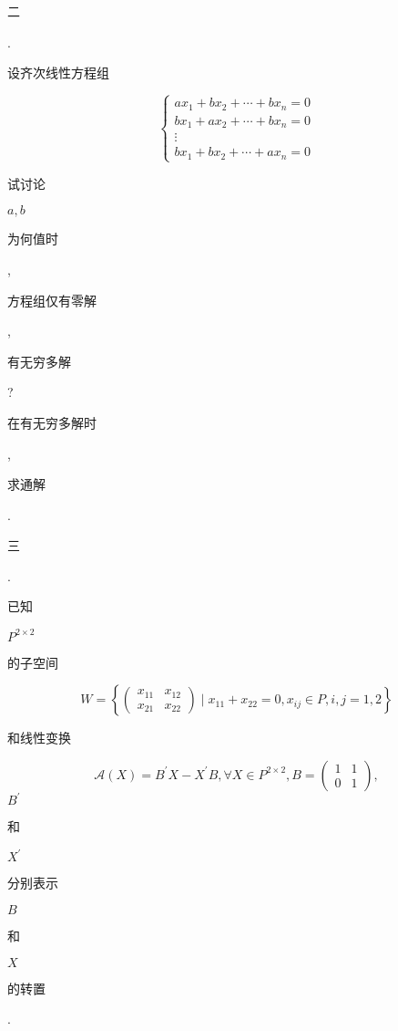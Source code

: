 \documentclass[10pt]{article}
\begin{document}
\begin{CJK}{UTF8}{mj}二\end{CJK}. \begin{CJK}{UTF8}{mj}设齐次线性方程组\end{CJK}
$$
\left\{\begin{array}{c}
a x_{1}+b x_{2}+\cdots+b x_{n}=0 \\
b x_{1}+a x_{2}+\cdots+b x_{n}=0 \\
\vdots \\
b x_{1}+b x_{2}+\cdots+a x_{n}=0
\end{array}\right.
$$
\begin{CJK}{UTF8}{mj}试讨论\end{CJK} $a, b$ \begin{CJK}{UTF8}{mj}为何值时\end{CJK}, \begin{CJK}{UTF8}{mj}方程组仅有零解\end{CJK}, \begin{CJK}{UTF8}{mj}有无穷多解\end{CJK}? \begin{CJK}{UTF8}{mj}在有无穷多解时\end{CJK}, \begin{CJK}{UTF8}{mj}求通解\end{CJK}.

\begin{CJK}{UTF8}{mj}三\end{CJK}. \begin{CJK}{UTF8}{mj}已知\end{CJK} $P^{2 \times 2}$ \begin{CJK}{UTF8}{mj}的子空间\end{CJK}
$$
W=\left\{\left(\begin{array}{ll}
x_{11} & x_{12} \\
x_{21} & x_{22}
\end{array}\right) \mid x_{11}+x_{22}=0, x_{i j} \in P, i, j=1,2\right\}
$$
\begin{CJK}{UTF8}{mj}和线性变换\end{CJK}
$$
\mathscr{A}(X)=B^{\prime} X-X^{\prime} B, \forall X \in P^{2 \times 2}, B=\left(\begin{array}{ll}
1 & 1 \\
0 & 1
\end{array}\right),
$$
$B^{\prime}$ \begin{CJK}{UTF8}{mj}和\end{CJK} $X^{\prime}$ \begin{CJK}{UTF8}{mj}分别表示\end{CJK} $B$ \begin{CJK}{UTF8}{mj}和\end{CJK} $X$ \begin{CJK}{UTF8}{mj}的转置\end{CJK}.
\end{document}
